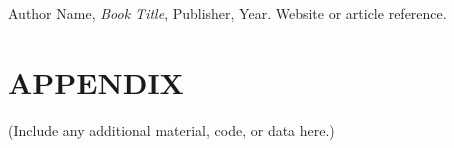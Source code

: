 \documentclass[a4paper,12pt,oneside]{report}
\numberwithin{equation}{chapter}
\numberwithin{figure}{chapter}
\numberwithin{table}{chapter}
\begin{document}
\newpage
\begin{thebibliography}{9}
 Author Name, \textit{Book Title}, Publisher, Year.
 Website or article reference.
\end{thebibliography}

\appendix
\chapter*{APPENDIX}
(Include any additional material, code, or data here.)
\end{document}
